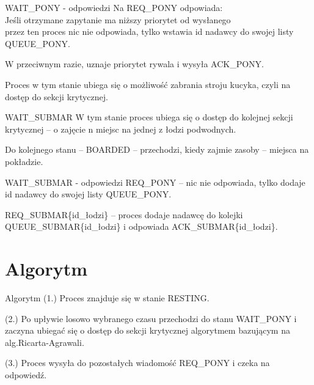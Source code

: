 \documentclass{beamer}
\newcommand\tab[1][1cm]{\hspace*{#1}}
\begin{document}
\begin{frame}{WAIT\_PONY - odpowiedzi}
    \internallinenumbers
    \resetlinenumber[1]
    Na REQ\_PONY odpowiada: \\
        \tab[0.5cm] Jeśli otrzymane zapytanie ma niższy priorytet od wysłanego \\
        \tab[0.5cm] przez ten proces nic nie odpowiada, tylko wstawia id nadawcy 
        \tab[0.5cm] do swojej listy QUEUE\_PONY.
        
        \vspace{0.3cm}
        \tab[0.5cm] W przeciwnym razie, uznaje priorytet rywala i wysyła ACK\_PONY.

    \vspace{0.3cm}
    Proces w tym stanie ubiega się o możliwość zabrania stroju kucyka, czyli na dostęp do sekcji krytycznej.
\end{frame}

\begin{frame}{WAIT\_SUBMAR}
    \internallinenumbers
    \resetlinenumber[1]
    W tym stanie proces ubiega się o dostęp do kolejnej sekcji krytycznej – o zajęcie n miejsc na jednej z łodzi podwodnych.

    \vspace{1cm}
    Do kolejnego stanu – BOARDED – przechodzi, kiedy zajmie zasoby – miejsca na pokładzie.
\end{frame}

\begin{frame}{WAIT\_SUBMAR - odpowiedzi}
    \internallinenumbers
    \resetlinenumber[1]
    REQ\_PONY – nic nie odpowiada, tylko dodaje id nadawcy do swojej listy QUEUE\_PONY.

    \vspace{1cm}
    REQ\_SUBMAR\{id\_łodzi\} – proces dodaje nadawcę do kolejki QUEUE\_SUBMAR\{id\_łodzi\} i odpowiada ACK\_SUBMAR\{id\_łodzi\}. 
\end{frame}

\section{Algorytm}
\begin{frame}{Algorytm}
    \internallinenumbers
    (1.) Proces znajduje się w stanie RESTING.

    \vspace{0.5cm}
    (2.) Po upływie losowo wybranego czasu przechodzi do stanu WAIT\_PONY i zaczyna ubiegać się o dostęp do sekcji krytycznej algorytmem bazującym na alg.Ricarta-Agrawali.

    \vspace{0.5cm}
    (3.) Proces wysyła do pozostałych wiadomość REQ\_PONY i czeka na odpowiedź.
\end{frame}
\end{document}
